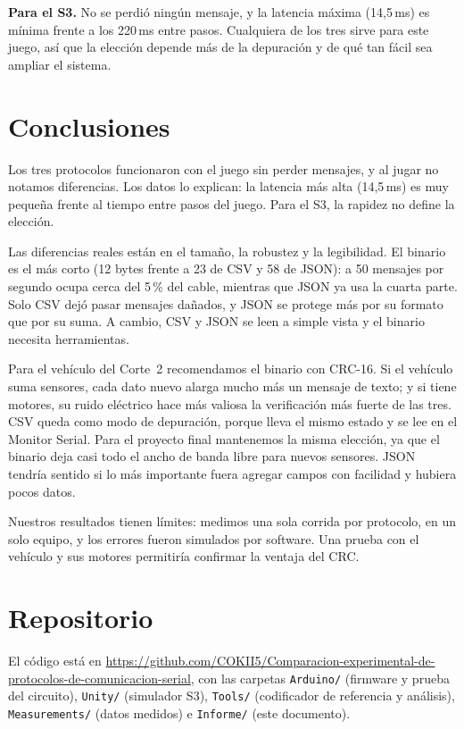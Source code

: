 \documentclass[journal]{IEEEtran}
\begin{document}
\textbf{Para el S3.} No se perdió ningún mensaje, y la latencia máxima (14,5\,ms) es mínima frente a los 220\,ms entre pasos. Cualquiera de los tres sirve para este juego, así que la elección depende más de la depuración y de qué tan fácil sea ampliar el sistema.

\section{Conclusiones}
Los tres protocolos funcionaron con el juego sin perder mensajes, y al jugar no notamos diferencias. Los datos lo explican: la latencia más alta (14,5\,ms) es muy pequeña frente al tiempo entre pasos del juego. Para el S3, la rapidez no define la elección.

Las diferencias reales están en el tamaño, la robustez y la legibilidad. El binario es el más corto (12 bytes frente a 23 de CSV y 58 de JSON): a 50 mensajes por segundo ocupa cerca del 5\,\% del cable, mientras que JSON ya usa la cuarta parte. Solo CSV dejó pasar mensajes dañados, y JSON se protege más por su formato que por su suma. A cambio, CSV y JSON se leen a simple vista y el binario necesita herramientas.

Para el vehículo del Corte~2 recomendamos el binario con CRC-16. Si el vehículo suma sensores, cada dato nuevo alarga mucho más un mensaje de texto; y si tiene motores, su ruido eléctrico hace más valiosa la verificación más fuerte de las tres. CSV queda como modo de depuración, porque lleva el mismo estado y se lee en el Monitor Serial. Para el proyecto final mantenemos la misma elección, ya que el binario deja casi todo el ancho de banda libre para nuevos sensores. JSON tendría sentido si lo más importante fuera agregar campos con facilidad y hubiera pocos datos.

Nuestros resultados tienen límites: medimos una sola corrida por protocolo, en un solo equipo, y los errores fueron simulados por software. Una prueba con el vehículo y sus motores permitiría confirmar la ventaja del CRC.

\section{Repositorio}
El código está en \url{https://github.com/COKII5/Comparacion-experimental-de-protocolos-de-comunicacion-serial}, con las carpetas \texttt{Arduino/} (firmware y prueba del circuito), \texttt{Unity/} (simulador S3), \texttt{Tools/} (codificador de referencia y análisis), \texttt{Measurements/} (datos medidos) e \texttt{Informe/} (este documento).
\end{document}
